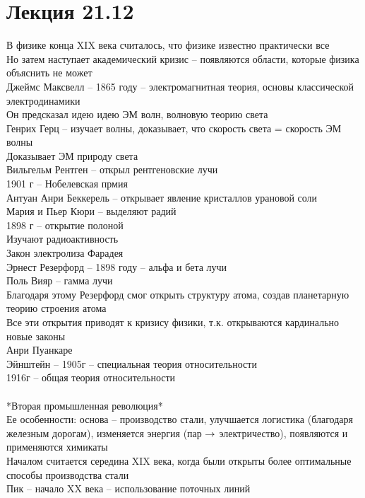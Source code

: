 \documentclass[12pt]{article}
\begin{document}
\section{Лекция 21.12}
В физике конца XIX века считалось, что физике известно практически все\\
Но затем наступает академический кризис -- появляются области, которые физика объяснить не может\\
Джеймс Максвелл -- 1865 году -- электромагнитная теория, основы классической электродинамики\\
Он предсказал идею идею ЭМ волн, волновую теорию света\\
Генрих Герц -- изучает волны, доказывает, что скорость света = скорость ЭМ волны\\
Доказывает ЭМ природу света\\
Вильгельм Рентген -- открыл рентгеновские лучи\\
1901 г -- Нобелевская прмия\\
Антуан Анри Беккерель -- открывает явление кристаллов урановой соли\\
Мария и Пьер Кюри -- выделяют радий\\
1898 г -- открытие полоной\\
Изучают радиоактивность\\
Закон электролиза Фарадея\\
Эрнест Резерфорд -- 1898 году -- альфа и бета лучи\\
Поль Вияр -- гамма лучи\\
Благодаря этому Резерфорд смог открыть структуру атома, создав планетарную теорию строения атома\\
Все эти открытия приводят к кризису физики, т.к. открываются кардинально новые законы\\
Анри Пуанкаре\\
Эйнштейн -- 1905г -- специальная теория относительности\\
1916г -- общая теория относительности\\\\
*Вторая промышленная революция*\\
Ее особенности: основа -- производство стали, улучшается логистика (благодаря железным дорогам), изменяется энергия (пар $\rightarrow$ электричество), появляются и применяются химикаты\\
Началом считается середина XIX века, когда были открыты более оптимальные способы производства стали\\
Пик -- начало XX века -- использование поточных линий\\
\end{document}
